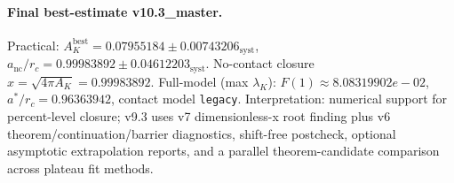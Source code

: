 \paragraph{Final best-estimate v10.3_master.}
Practical: $A_K^{\mathrm{best}} = 0.07955184 \pm 0.00743206_{\mathrm{syst}}$, $a_{\mathrm{nc}}/r_c = 0.99983892 \pm 0.04612203_{\mathrm{syst}}$.
No-contact closure $x = \sqrt{4\pi A_K} = 0.99983892$.
Full-model (max $\lambda_K$): $F(1) \approx 8.08319902e-02$, $a^*/r_c = 0.96363942$, contact model \texttt{legacy}.
Interpretation: numerical support for percent-level closure; v9.3 uses v7 dimensionless-x root finding plus v6 theorem/continuation/barrier diagnostics, shift-free postcheck, optional asymptotic extrapolation reports, and a parallel theorem-candidate comparison across plateau fit methods.
